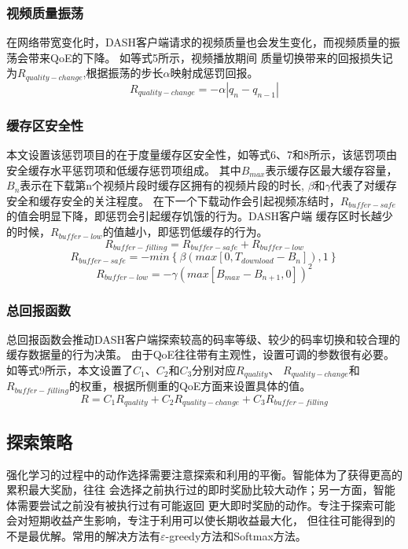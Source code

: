 \documentclass[twocolumn]{article}
\begin{document}
\subsubsection{视频质量振荡}
在网络带宽变化时，DASH客户端请求的视频质量也会发生变化，而视频质量的振荡会带来QoE的下降。
如等式5所示，视频播放期间
质量切换带来的回报损失记为$R_{quality-change}$,根据振荡的步长$\alpha$映射成惩罚回报。
\begin{equation}
R_{quality-change}=-\alpha\left|q_{n}-q_{n-1}\right|
\end{equation}
\subsubsection{缓存区安全性}
本文设置该惩罚项目的在于度量缓存区安全性，如等式6、7和8所示，该惩罚项由安全缓存水平惩罚项和低缓存惩罚项组成。
其中$B_{max}$表示缓存区最大缓存容量，$B_{n}$表示在下载第n个视频片段时缓存区拥有的视频片段的时长,
$\beta$和$\gamma$代表了对缓存安全和缓存安全的关注程度。
在下一个下载动作会引起视频冻结时，$R_{buffer-safe}$的值会明显下降，即惩罚会引起缓存饥饿的行为。DASH客户端
缓存区时长越少的时候，$R_{buffer-low}$的值越小，即惩罚低缓存的行为。
\begin{equation}
R_{buffer-filling}=R_{buffer-safe}+R_{buffer-low}
\end{equation}
\begin{equation}
R_{buffer-safe}=-min\left\{\beta\left(max\left[0,T_{download}-B_{n}\right]\right),1\right\}
\end{equation}
\begin{equation}
R_{buffer-low}=-\gamma\left(max\left[B_{max}-B_{n+1},0\right]\right)^2
\end{equation}
\subsubsection{总回报函数}
总回报函数会推动DASH客户端探索较高的码率等级、较少的码率切换和较合理的缓存数据量的行为决策。
由于QoE往往带有主观性，设置可调的参数很有必要。
如等式9所示，本文设置了$C_{1}$、$C_{2}$和$C_{3}$分别对应$R_{quality}$、
$R_{quality-change}$和$R_{buffer-filling}$的权重，根据所侧重的QoE方面来设置具体的值。
\begin{equation}
R=C_{1}R_{quality}+C_{2}R_{quality-change}+C_{3}R_{buffer-filling}
\end{equation}
\subsection{探索策略}
强化学习的过程中的动作选择需要注意探索和利用的平衡。智能体为了获得更高的累积最大奖励，往往
会选择之前执行过的即时奖励比较大动作；另一方面，智能体需要尝试之前没有被执行过有可能返回
更大即时奖励的动作。专注于探索可能会对短期收益产生影响，专注于利用可以使长期收益最大化，
但往往可能得到的不是最优解。常用的解决方法有$\varepsilon$-greedy方法和Softmax方法\cite{RN18}。
\end{document}
